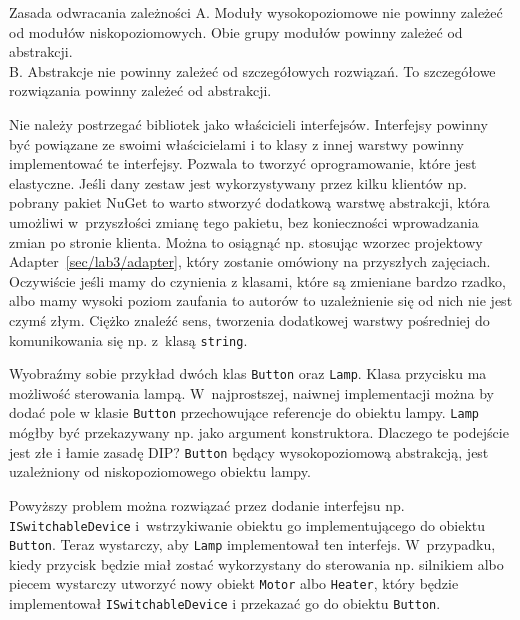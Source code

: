 \begin{myboxWithTitle}{Zasada odwracania zależności}
	A. Moduły wysokopoziomowe nie powinny zależeć od modułów niskopoziomowych. Obie grupy modułów powinny zależeć od abstrakcji.\\
	B. Abstrakcje nie powinny zależeć od szczegółowych rozwiązań. To szczegółowe rozwiązania powinny zależeć od abstrakcji.
\end{myboxWithTitle}

Nie należy postrzegać bibliotek jako właścicieli interfejsów. Interfejsy powinny być powiązane ze swoimi właścicielami i to klasy z innej warstwy powinny implementować te interfejsy. %
Pozwala to tworzyć oprogramowanie, które jest elastyczne. Jeśli dany zestaw jest wykorzystywany przez kilku klientów np. pobrany pakiet NuGet to warto stworzyć dodatkową warstwę abstrakcji, która umożliwi w~przyszłości zmianę tego pakietu, bez konieczności wprowadzania zmian po stronie klienta. Można to osiągnąć np. stosując wzorzec projektowy Adapter~\ref{sec/lab3/adapter}, który zostanie omówiony na przyszłych zajęciach. Oczywiście jeśli mamy do czynienia z klasami, które są zmieniane bardzo rzadko, albo mamy wysoki poziom zaufania to autorów to uzależnienie się od nich nie jest czymś złym. Ciężko znaleźć sens, tworzenia dodatkowej warstwy pośredniej do komunikowania się np. z~klasą \texttt{string}.

Wyobraźmy sobie przykład dwóch klas \texttt{Button} oraz \texttt{Lamp}. Klasa przycisku ma możliwość sterowania lampą. W~najprostszej, naiwnej implementacji można by dodać pole w klasie \texttt{Button} przechowujące referencje do obiektu lampy. \texttt{Lamp} mógłby być przekazywany np. jako argument konstruktora. Dlaczego te podejście jest złe i łamie zasadę DIP? \texttt{Button} będący wysokopoziomową abstrakcją, jest uzależniony od niskopoziomowego obiektu lampy.

Powyższy problem można rozwiązać przez dodanie interfejsu np. \texttt{ISwitchableDevice} i~wstrzykiwanie obiektu go implementującego do obiektu \texttt{Button}. Teraz wystarczy, aby \texttt{Lamp} implementował ten interfejs. W~przypadku, kiedy przycisk będzie miał zostać wykorzystany do sterowania np. silnikiem albo piecem wystarczy utworzyć nowy obiekt \texttt{Motor} albo \texttt{Heater}, który będzie implementował \texttt{ISwitchableDevice} i przekazać go do obiektu \texttt{Button}.

